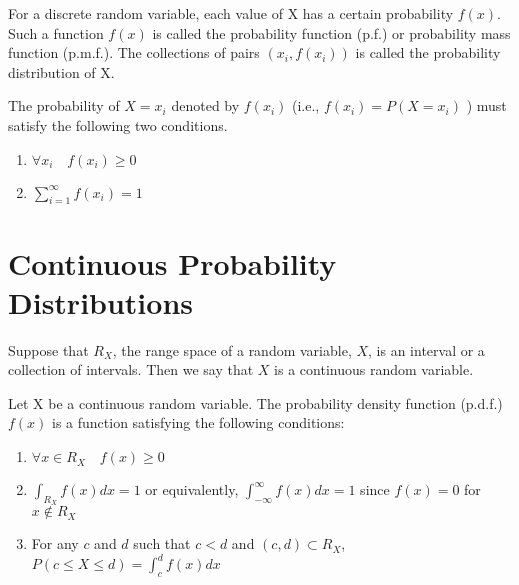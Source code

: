 \begin{definition}
For a discrete random variable, each value of X has a certain probability $f(x)$. Such a function $f(x)$ is called the probability function (p.f.) or probability mass function (p.m.f.). The collections of pairs $(x_i, f(x_i))$ is called the probability distribution of X.
\end{definition}

\begin{note}\end{note}
The probability of $X = x_i$ denoted by $f(x_i)$ (i.e., $f(x_i) = P(X = x_i)$ ) must satisfy the following two conditions.
\begin{enumerate}
    \item $\forall x_i \quad f(x_i) \geq 0$
    \item $\sum_{i = 1}^{\infty}f(x_i) = 1$
\end{enumerate}

\section{Continuous Probability Distributions}

\begin{definition}
Suppose that $R_X$, the range space of a random variable, $X$, is an interval or a collection of intervals. Then we say that $X$ is a continuous random variable.
\end{definition}

\begin{definition}
Let X be a continuous random variable. The probability density function (p.d.f.) $f(x)$ is a function satisfying the following conditions:
\begin{enumerate}
    \item $\forall x \in R_X \quad f(x) \geq 0 $
    \item $\int_{R_X} f(x)dx = 1 $ or equivalently, $\int_{-\infty}^{\infty} f(x)dx = 1$ since $f(x) = 0$ for $x \notin R_X$ 
    \item For any $c$ and $d$ such that $c < d$ and $(c,d) \subset R_X$, $P(c \leq X \leq d) = \int_{c}^{d} f(x) dx $
\end{enumerate}
\end{definition}

